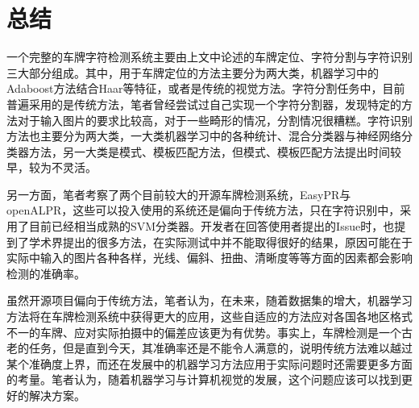 \section{总结}
一个完整的车牌字符检测系统主要由上文中论述的车牌定位、字符分割与字符识别三大部分组成。其中，用于车牌定位的方法主要分为两大类，机器学习中的Adaboost方法结合Haar等特征，或者是传统的视觉方法。字符分割任务中，目前普遍采用的是传统方法，笔者曾经尝试过自己实现一个字符分割器，发现特定的方法对于输入图片的要求比较高，对于一些畸形的情况，分割情况很糟糕。字符识别方法也主要分为两大类，一大类机器学习中的各种统计、混合分类器与神经网络分类器方法，另一大类是模式、模板匹配方法，但模式、模板匹配方法提出时间较早，较为不灵活。

另一方面，笔者考察了两个目前较大的开源车牌检测系统，EasyPR与openALPR，这些可以投入使用的系统还是偏向于传统方法，只在字符识别中，采用了目前已经相当成熟的SVM分类器。开发者在回答使用者提出的Issue时，也提到了学术界提出的很多方法，在实际测试中并不能取得很好的结果，原因可能在于实际中输入的图片各种各样，光线、偏斜、扭曲、清晰度等等方面的因素都会影响检测的准确率。

虽然开源项目偏向于传统方法，笔者认为，在未来，随着数据集的增大，机器学习方法将在车牌检测系统中获得更大的应用，这些自适应的方法应对各国各地区格式不一的车牌、应对实际拍摄中的偏差应该更为有优势。事实上，车牌检测是一个古老的任务，但是直到今天，其准确率还是不能令人满意的，说明传统方法难以越过某个准确度上界，而还在发展中的机器学习方法应用于实际问题时还需要更多方面的考量。笔者认为，随着机器学习与计算机视觉的发展，这个问题应该可以找到更好的解决方案。
